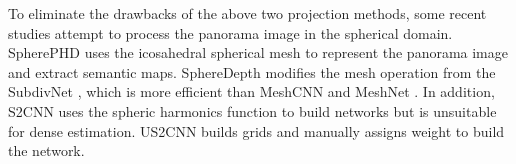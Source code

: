 To eliminate the drawbacks of the above two projection methods, some recent studies attempt to process the panorama image in the spherical domain.
SpherePHD \cite{lee2020spherephd} uses the icosahedral spherical mesh to represent the panorama image and extract semantic maps. SphereDepth \cite{yan2022spheredepth} modifies the mesh operation from the SubdivNet \cite{hu2021subdivision}, which is more efficient than MeshCNN \cite{hanocka2019meshcnn} and MeshNet \cite{feng2019meshnet}.
In addition, S2CNN \cite{cohen2018spherical} uses the spheric harmonics function to build networks but is unsuitable for dense estimation. US2CNN \cite{jiang2019spherical} builds grids and manually assigns weight to build the network. 

